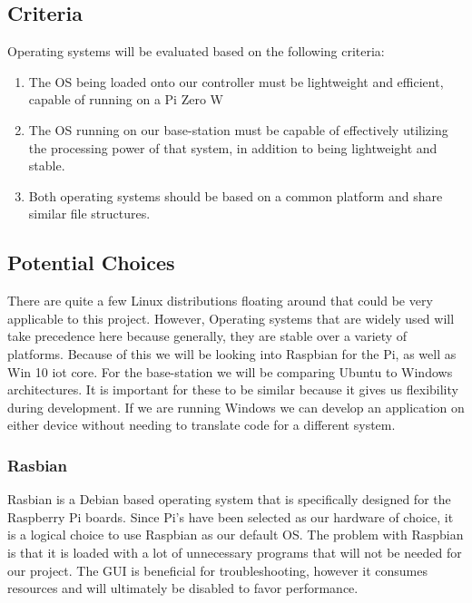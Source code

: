 \documentclass[onecolumn, draftclsnofoot,10pt, compsoc]{IEEEtran}
\begin{document}
\subsection{Criteria}

Operating systems will be evaluated based on the following criteria:
\begin{enumerate}
\item{The OS being loaded onto our controller must be lightweight 
and efficient, capable of running on a Pi Zero W}

\item{The OS running on our base-station must be capable of 
effectively utilizing the processing power of that system, in 
addition to being lightweight and stable.}

\item{Both operating systems should be based on a common platform 
and share similar file structures.}
\end{enumerate}

\subsection{Potential Choices}

There are quite a few Linux distributions floating around that 
could be very applicable to this project. However, Operating 
systems that are widely used will take precedence here because 
generally, they are stable over a variety of platforms. Because of 
this we will be looking into Raspbian for the Pi, as well as Win 10 
iot core. For the base-station we will be comparing Ubuntu to 
Windows architectures. It is important for these to be similar 
because it gives us flexibility during development. If we are 
running Windows we can develop an application on either device 
without needing to translate code for a different system.

\subsubsection{Rasbian}

Rasbian\cite{r5} is a Debian based operating system that is specifically 
designed for the Raspberry Pi boards. Since Pi's have been selected 
as our hardware of choice, it is a logical choice to use Raspbian as 
our default OS. The problem with Raspbian is that it is loaded with 
a lot of unnecessary programs that will not be needed for our 
project. The GUI is beneficial for troubleshooting, however it 
consumes resources and will ultimately be disabled to favor 
performance. 
\end{document}
